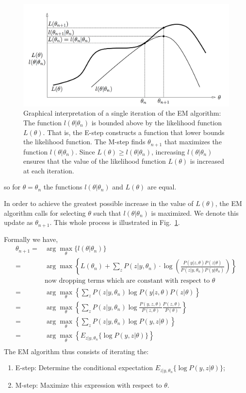 \documentclass{article}  %
\begin{document}
\begin{figure}[!ht]
\includegraphics[width=1\textwidth,natwidth=610,natheight=642]{iter.png}
\caption{Graphical interpretation of a single iteration of the EM algorithm: The
function $l(\theta|\theta_n)$ is bounded above by the likelihood function $L(\theta)$. That is, the E-step constructs a function that lower bounds the likelihood function. The M-step finds $\theta_{n+1}$ that maximizes the function $l(\theta|\theta_n)$. Since $L(\theta) \geq l(\theta|\theta_n)$, increasing $l(\theta|\theta_n)$ ensures that the value of the likelihood function $L(\theta)$ is increased at each iteration.}
\label{fig:em}
\end{figure}%

so for $\theta=\theta_n$ the functions $l(\theta|\theta_n)$ and $L(\theta)$ are equal.

In order to achieve the greatest possible increase in the value of $L(\theta)$, the EM algorithm calls for selecting $\theta$ such that $l(\theta|\theta_n)$ is maximized. We denote this update as $\theta_{n+1}$. This whole process is illustrated in Fig.~\ref{fig:em}.


Formally we have,
\begin{align*}
\theta_{n+1} = &\arg\max _\theta \{ l(\theta|\theta_n)\} \\
 = & \arg\max\left\{L(\theta_n) +  \sum_z P(z|y,\theta_n)\cdot \log \left(\frac{P(y|z,\theta)P(z|\theta)}{P(z|y,\theta_n)P(y|\theta_n)} \right)\right\}\\
 & \text {now dropping terms which are constant with respect to $\theta$}\\
 = & \arg\max_\theta \left\{ \sum_z P(z|y,\theta_n) \log P(y|z,\theta) P(z|\theta)  \right\}\\
 = & \arg\max_\theta \left\{ \sum_z P(z|y,\theta_n) \log \frac{P(y,z,\theta)}{P(z,\theta)} \frac{P(z,\theta)}{P(\theta)} \right\}\\
  = & \arg\max_\theta \left\{ \sum_z P(z|y,\theta_n) \log P(y,z|\theta) \right\}\\
\label{eqn:em}  = & \arg\max_\theta \left\{ E_{z|y,\theta_n} \{\log P(y,z|\theta)\} \right\}\\
\end{align*}
The EM algorithm thus consists of iterating the:
\begin{enumerate}
\item E-step: Determine the conditional expectation $E_{z|y,\theta_n} \{\log P(y,z|\theta)\}$;
\item M-step: Maximize this expression with respect to $\theta$.
\end{enumerate}
\end{document}
